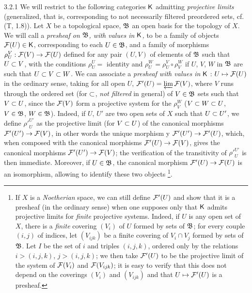 \documentclass[../main.tex]{subfiles}
\begin{document}
\begin{env}{3.2.1}
We will restrict to the following categories $\mathsf{K}$ admitting
\emph{projective limits} (generalized, that is, corresponding to not necessarily filtered preordered sets,
cf. (T, 1.8)). Let $X$ be a topological space, $\mathfrak{B}$ an open basis
for the topology of $X$. We will call a \emph{presheaf on $\mathfrak{B}$, with values in $\mathsf{K}$,} to be
a family of objects $\mathcal{F}(U)\in\mathsf{K}$, corresponding to each $U\in\mathfrak{B}$, and a family of morphisms
$\rho_U^V:\mathcal{F}(V)\to\mathcal{F}(U)$ defined for any pair $(U,V)$ of elements of $\mathfrak{B}$ such that $U\subset V$,
with the conditions $\rho_U^U=$ identity and $\rho_U^W=\rho_U^V\circ\rho_V^W$ if $U$, $V$, $W$ in
$\mathfrak{B}$ are such that $U\subset V\subset W$. We can associate a \emph{presheaf with values in} $\mathsf{K}$ : $U\mapsto\mathcal{F}(U)$
in the ordinary sense, taking for all open $U$, $\mathcal{F}'(U)=\varprojlim\mathcal{F}(V)$, where $V$ runs through
the ordered set (for $\subset$, \emph{not filtered} in general) of $V\in\mathfrak{B}$ sets such that $V\subset U$, since
the $\mathcal{F}(V)$ form a projective system for the $\rho_V^W$ ($V\subset W\subset U$, $V\in\mathfrak{B}$, $W\in\mathfrak{B}$).
Indeed, if $U$, $U'$ are two open sets of $X$ such that $U\subset U'$, we define ${\rho'}_U^{U'}$ as the
projective limit (for $V\subset U$) of the canonical morphisms $\mathcal{F}'(U')\to\mathcal{F}(V)$, in other words
the unique morphism y $\mathcal{F}'(U')\to\mathcal{F}'(U)$, which, when composed with the canonical morphisms
$\mathcal{F}'(U)\to\mathcal{F}(V)$, gives the canonical morphisms $\mathcal{F}'(U')\to\mathcal{F}(V)$; the verification of
the transitivity of ${\rho'}_U^{U'}$ is then immediate. Moreover, if $U\in\mathfrak{B}$,
the canonical morphism $\mathcal{F}'(U)\to\mathcal{F}(U)$ is an isomorphism, allowing to identify these two objects
\footnote{
If $X$ is a \emph{Noetherian} space, we can still define $\mathcal{F}'(U)$ and show that it is a presheaf (in the
ordinary sense) when one supposes only that $\mathsf{K}$ admits projective limits for \emph{finite} projective systems. Indeed,
if $U$ is any open set of $X$, there is a \emph{finite} covering $(V_i)$ of $U$ formed by sets of $\mathfrak{B}$; for every
couple $(i,j)$ of indices, let $(V_{ijk})$ be a finite covering of $V_i\cap V_j$ formed by sets of $\mathfrak{B}$. Let $I$ be the set
of $i$ and triples $(i,j,k)$, ordered only by the relations $i>(i,j,k)$, $j>(i,j,k)$; we then take $\mathcal{F}'(U)$ to be
the projective limit of the system of $\mathcal{F}(V_i)$ and $\mathcal{F}(V_{ijk})$; it is easy to verify that this does not depend on the
coverings $(V_i)$ and $(V_{ijk})$ and that $U\mapsto\mathcal{F}'(U)$ is a presheaf.}.
\end{env}
\end{document}
